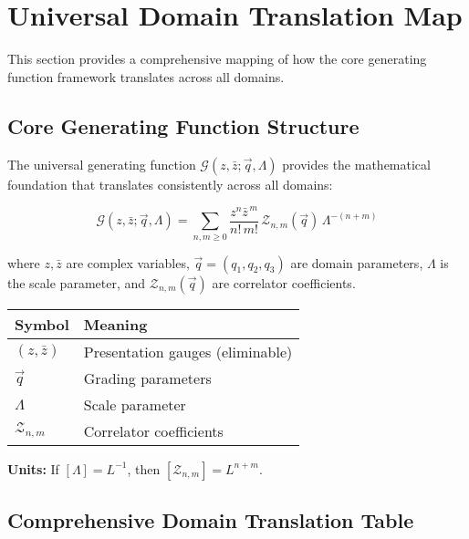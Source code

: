 \section{Universal Domain Translation Map}
\label{sec:domain-translation-map}

This section provides a comprehensive mapping of how the core generating function framework translates across all domains.

\subsection{Core Generating Function Structure}

The universal generating function $\mathcal{G}(z,\bar{z};\vec{q},\Lambda)$ provides the mathematical foundation that translates consistently across all domains:

\begin{equation}
\mathcal{G}(z,\bar{z};\vec{q},\Lambda) = \sum_{n,m\ge0}\frac{z^n\bar{z}^{\,m}}{n!\,m!}\,\mathcal{Z}_{n,m}(\vec{q})\,\Lambda^{-(n+m)}
\label{eq:universal-generating-function}
\end{equation}

where $z,\bar{z}$ are complex variables, $\vec{q} = (q_1,q_2,q_3)$ are domain parameters, $\Lambda$ is the scale parameter, and $\mathcal{Z}_{n,m}(\vec{q})$ are correlator coefficients.

\begin{table}[h]
\centering
\footnotesize
\begin{tabular}{|l|l|}
\hline
\textbf{Symbol} & \textbf{Meaning} \\
\hline
$(z,\bar{z})$ & Presentation gauges (eliminable) \\
$\vec{q}$ & Grading parameters \\
$\Lambda$ & Scale parameter \\
$\mathcal{Z}_{n,m}$ & Correlator coefficients \\
\hline
\end{tabular}
\end{table}

\textbf{Units:} If $[\Lambda] = L^{-1}$, then $[\mathcal{Z}_{n,m}] = L^{n+m}$.

\subsection{Comprehensive Domain Translation Table}


